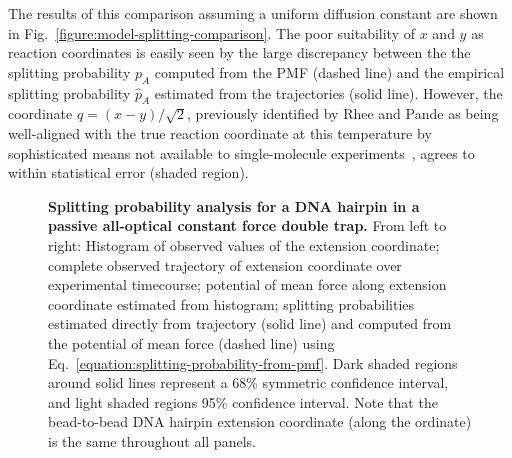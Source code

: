 \documentclass[aps,prl,twocolumn,superscriptaddress,floatfix]{revtex4-1}
\begin{document}
The results of this comparison {\color{black}assuming a uniform diffusion constant} are shown in Fig.~\ref{figure:model-splitting-comparison}.
The poor suitability of $x$ and $y$ as reaction coordinates is easily seen by the large discrepancy between the the splitting probability $p_A$ computed from the PMF (dashed line) and the empirical splitting probability $\hat{p}_A$ estimated from the trajectories (solid line).
However, the coordinate $q = (x - y)/\sqrt{2}$, previously identified by Rhee and Pande as being well-aligned with the true reaction coordinate at this temperature by sophisticated means not available to single-molecule experiments~\cite{rhee:jpcb:2005:splitting-probability}, agrees to within statistical error (shaded region).


\begin{figure}[tbp]
\noindent
\caption{\label{figure:dna-hairpin} {\bf Splitting probability analysis for a DNA hairpin in a passive all-optical constant force double trap.}
From left to right: Histogram of observed values of the extension coordinate; 
complete observed trajectory of extension coordinate over experimental timecourse; 
potential of mean force along extension coordinate estimated from histogram; 
splitting probabilities estimated directly from trajectory (solid line) and computed from the potential of mean force (dashed line) using Eq.~\ref{equation:splitting-probability-from-pmf}.
Dark shaded regions around solid lines represent a 68\% symmetric confidence interval, and light shaded regions 95\% confidence interval.
Note that the bead-to-bead DNA hairpin extension coordinate (along the ordinate) is the same throughout all panels. 
} 
\end{figure}
\end{document}
